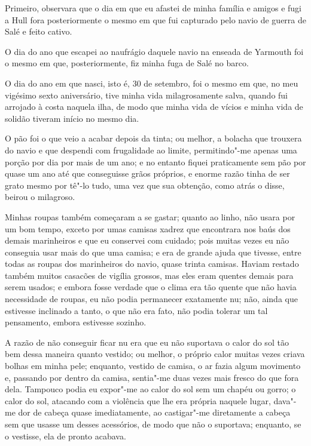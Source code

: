 Primeiro, observara que o dia em que eu afastei de minha família e
amigos e fugi a Hull fora posteriormente o mesmo em que fui capturado
pelo navio de guerra de Salé e feito cativo.

O dia do ano que escapei ao naufrágio daquele navio na enseada de
Yarmouth foi o mesmo em que, posteriormente, fiz minha fuga de Salé no
barco.

O dia do ano em que nasci, isto é, 30 de setembro, foi o mesmo em que,
no meu vigésimo sexto aniversário, tive minha vida milagrosamente salva,
quando fui arrojado à costa naquela ilha, de modo que minha vida de
vícios e minha vida de solidão tiveram início no mesmo dia.

O pão foi o que veio a acabar depois da tinta; ou melhor, a bolacha que
trouxera do navio e que despendi com frugalidade ao limite,
permitindo"-me apenas uma porção por dia por mais de um ano; e no entanto
fiquei praticamente sem pão por quase um ano até que conseguisse grãos
próprios, e enorme razão tinha de ser grato mesmo por tê"-lo tudo, uma
vez que sua obtenção, como atrás o disse, beirou o milagroso.

Minhas roupas também começaram a se gastar; quanto ao linho, não usara
por um bom tempo, exceto por umas camisas xadrez que encontrara nos baús
dos demais marinheiros e que eu conservei com cuidado; pois muitas vezes
eu não conseguia usar mais do que uma camisa; e era de grande ajuda que
tivesse, entre todas as roupas dos marinheiros do navio, quase trinta
camisas. Haviam restado também muitos casacões de vigília grossos, mas
eles eram quentes demais para serem usados; e embora fosse verdade que o
clima era tão quente que não havia necessidade de roupas, eu não podia
permanecer exatamente nu; não, ainda que estivesse inclinado a tanto, o
que não era fato, não podia tolerar um tal pensamento, embora estivesse
sozinho.

A razão de não conseguir ficar nu era que eu não suportava o calor do
sol tão bem dessa maneira quanto vestido; ou melhor, o próprio calor
muitas vezes criava bolhas em minha pele; enquanto, vestido de camisa, o
ar fazia algum movimento e, passando por dentro da camisa, sentia"-me
duas vezes mais fresco do que fora dela. Tampouco podia eu expor"-me ao
calor do sol sem um chapéu ou gorro; o calor do sol, atacando com a
violência que lhe era própria naquele lugar, dava"-me dor de cabeça quase
imediatamente, ao castigar"-me diretamente a cabeça sem que usasse um
desses acessórios, de modo que não o suportava; enquanto, se o vestisse,
ela de pronto acabava.

